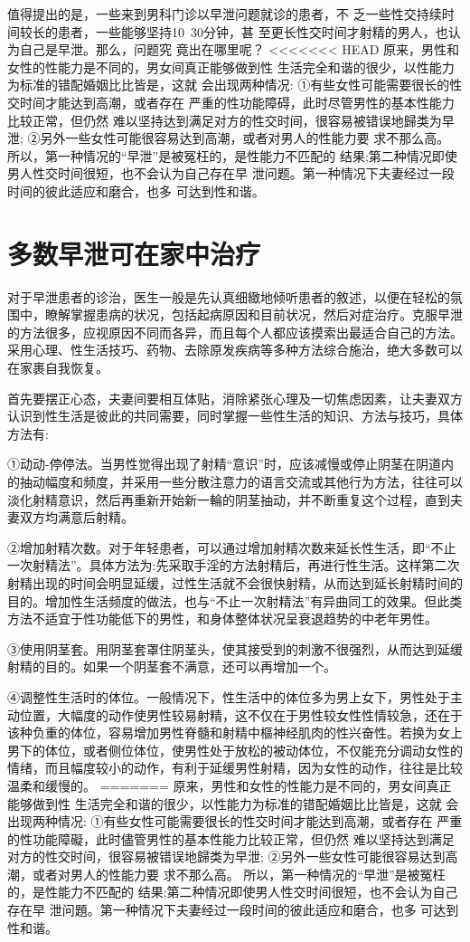 \documentclass[12pt,UTF8]{ctexbook}
\begin{document}
值得提出的是，一些来到男科门诊以早泄问题就诊的患者，不
乏一些性交持续时间较长的患者，一些能够坚持10~30分钟，甚
至更长性交时间才射精的男人，也认为自己是早泄。那么，问题究
竟出在哪里呢？
<<<<<<< HEAD
原来，男性和女性的性能力是不同的，男女间真正能够做到性
生活完全和谐的很少，以性能力为标准的错配婚姻比比皆是，这就
会出现两种情况:
①有些女性可能需要很长的性交时间才能达到高潮，或者存在
严重的性功能障碍，此时尽管男性的基本性能力比较正常，但仍然
难以坚持达到满足对方的性交时间，很容易被错误地歸类为早泄;
②另外一些女性可能很容易达到高潮，或者对男人的性能力要
求不那么高。
所以，第一种情况的“早泄”是被冤枉的，是性能力不匹配的
结果;第二种情况即使男人性交时间很短，也不会认为自己存在早
泄问题。第一种情况下夫妻经过一段时间的彼此适应和磨合，也多
可达到性和谐。

\section{多数早泄可在家中治疗}

对于早泄患者的诊治，医生一般是先认真细緻地倾听患者的敘述，以便在轻松的氛围中，瞭解掌握患病的状况，包括起病原因和目前状况，然后对症治疗。克服早泄的方法很多，应视原因不同而各异，而且每个人都应该摸索出最适合自己的方法。采用心理、性生活技巧、药物、去除原发疾病等多种方法综合施治，绝大多数可以在家裹自我恢复。

首先要摆正心态，夫妻间要相互体贴，消除紧张心理及一切焦虑因素，让夫妻双方认识到性生活是彼此的共同需要，同时掌握一些性生活的知识、方法与技巧，具体方法有:

①动动-停停法。当男性觉得出现了射精“意识”时，应该减慢或停止阴茎在阴道内的抽动幅度和频度，并采用一些分散注意力的语言交流或其他行为方法，往往可以淡化射精意识，然后再重新开始新一輪的阴茎抽动，并不断重复这个过程，直到夫妻双方均满意后射精。

②增加射精次数。对于年轻患者，可以通过增加射精次数来延长性生活，即“不止一次射精法”。具体方法为:先采取手淫的方法射精后，再进行性生活。这样第二次射精出现的时间会明显延缓，过性生活就不会很快射精，从而达到延长射精时间的目的。增加性生活频度的做法，也与“不止一次射精法”有异曲同工的效果。但此类方法不适宜于性功能低下的男性，和身体整体状况呈衰退趋势的中老年男性。

③使用阴茎套。用阴茎套罩住阴茎头，使其接受到的刺激不很强烈，从而达到延缓射精的目的。如果一个阴茎套不满意，还可以再增加一个。

④调整性生活时的体位。一般情况下，性生活中的体位多为男上女下，男性处于主动位置，大幅度的动作使男性较易射精，这不仅在于男性较女性性情较急，还在于该种负重的体位，容易增加男性脊髓和射精中樞神经肌肉的性兴奋性。若换为女上男下的体位，或者侧位体位，使男性处于放松的被动体位，不仅能充分调动女性的情绪，而且幅度较小的动作，有利于延缓男性射精，因为女性的动作，往往是比较温柔和缓慢的。
=======
原来，男性和女性的性能力是不同的，男女间真正能够做到性
生活完全和谐的很少，以性能力为标准的错配婚姻比比皆是，这就
会出现两种情况:
①有些女性可能需要很长的性交时间才能达到高潮，或者存在
严重的性功能障礙，此时儘管男性的基本性能力比较正常，但仍然
难以坚持达到满足对方的性交时间，很容易被错误地歸类为早泄;
②另外一些女性可能很容易达到高潮，或者对男人的性能力要
求不那么高。
所以，第一种情况的“早泄”是被冤枉的，是性能力不匹配的
结果;第二种情况即使男人性交时间很短，也不会认为自己存在早
泄问題。第一种情况下夫妻经过一段时间的彼此适应和磨合，也多
可达到性和谐。
\end{document}
